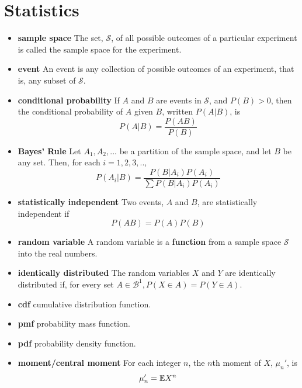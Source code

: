\chapter{Statistics}
\begin{itemize}
    \item \textbf{sample space} The set, $\mathcal{S}$, of all possible outcomes of a particular experiment is called the sample space for the experiment.
    \item \textbf{event} An event is any collection of possible outcomes of an experiment, that is, any subset of $\mathcal{S}$.
    \item \textbf{conditional probability} If $A$ and $B$ are events in $\mathcal{S}$, and $P(B) > 0$, then the conditional probability of $A$ given $B$, written $P(A|B)$, is
        \begin{equation}
            P(A|B) = \frac{P(AB)}{P(B)}
        \end{equation}
    \item \textbf{Bayes' Rule} Let $A_1, A_2,...$ be a partition of the sample space, and let $B$ be any set. Then, for each $i = 1, 2, 3, ..$,
        \begin{equation}
            P(A_i|B) = \frac{P(B|A_i)P(A_i)}{\sum P(B|A_i)P(A_i)}
        \end{equation}
    \item \textbf{statistically independent} Two events, $A$ and $B$, are statistically independent if 
        \begin{equation}
            P(AB) = P(A)P(B)
        \end{equation}
    \item \textbf{random variable} A random variable is a \textbf{function} from a sample space $\mathcal{S}$ into the real numbers.
    \item \textbf{identically distributed} The random variables $X$ and $Y$ are identically distributed if, for every set $A \in \mathcal{B}^1, P(X \in A) = P(Y \in A)$.
    \item \textbf{cdf} cumulative distribution function.
    \item \textbf{pmf} probability mass function.
    \item \textbf{pdf} probability density function.
    \item \textbf{moment/central moment} For each integer $n$, the $n$th moment of $X$, $\mu_n'$, is 
        \begin{equation}
            \mu_n' = \mathbb{E} X^n
        \end{equation}

\end{itemize}
